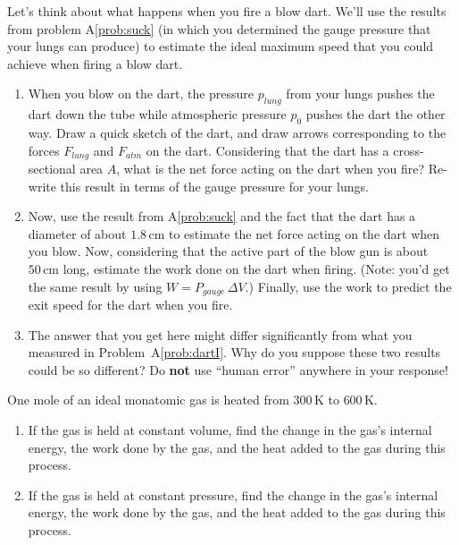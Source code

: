 \begin{exercise}  
  Let's think about what happens when you fire a blow dart.  We'll use
  the results from problem A\ref{prob:suck} (in which you determined
  the gauge pressure that your lungs can produce) to estimate the
  ideal maximum speed that you could achieve when firing a blow dart.

  \begin{enumerate}

  \item When you blow on the dart, the pressure $p_{ lung}$ from
    your lungs pushes the dart down the tube while atmospheric
    pressure $p_0$ pushes the dart the other way.  Draw a quick sketch
    of the dart, and draw arrows corresponding to the forces $F_{
      lung}$ and $F_{ atm}$ on the dart.  Considering that the dart
    has a cross-sectional area $A$, what is the net force acting on
    the dart when you fire?  Re-write this result in terms of the
    gauge pressure for your lungs.

  \item Now, use the result from A\ref{prob:suck} and the fact that
    the dart has a diameter of about $1.8\,\text{cm}$ to estimate the
    net force acting on the dart when you blow.  Now, considering that
    the active part of the blow gun is about $50\,\text{cm}$ long,
    estimate the work done on the dart when firing.  (Note: you'd get
    the same result by using $W = P_{ gauge}\, \Delta V$.)
    Finally, use the work to predict the exit speed for the dart when
    you fire.

  \item The answer that you get here might differ significantly from
    what you measured in Problem~A\ref{prob:dartI}.  Why do you
    suppose these two results could be so different?  Do \textbf{not} use
    ``human error'' anywhere in your response!
  \end{enumerate}
\end{exercise}

\begin{exercise} 
  One mole of an ideal monatomic gas is heated from $300\,\text{K}$
  to $600\,\text{K}$.
  \begin{enumerate}
  \item If the gas is held at constant volume, find the change in the
    gas's internal energy, the work done by the gas, and the heat
    added to the gas during this process.

  \item If the gas is held at constant pressure, find the change in
    the gas's internal energy, the work done by the gas, and the heat
    added to the gas during this process.
  \end{enumerate}
\end{exercise}


